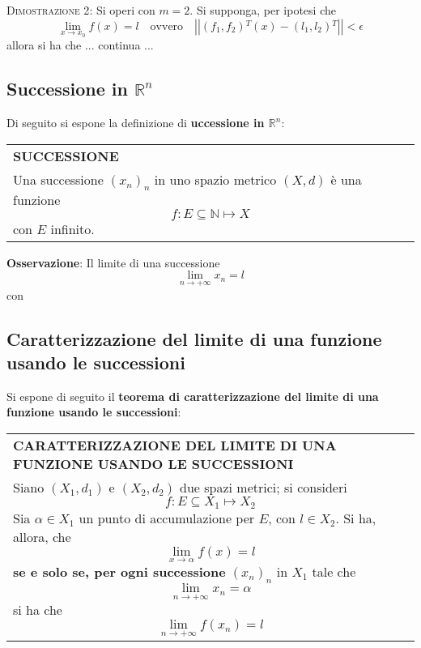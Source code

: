 \documentclass[a4paper]{extarticle}
\renewcommand\arraystretch{}
\begin{document}
\vspace{2em}
\noindent
\normalfont \normalsize
\textsc{Dimostrazione 2}: Si operi con $m=2$. Si supponga, per ipotesi che
\[\lim_{x \to x_0} f(x) = l \hspace{1em} \text{ovvero} \hspace{1em} \left \vert \left \vert (f_1,f_2){^T}(x) - (l_1,l_2){^T} \right \vert \right \vert < \epsilon\]
allora si ha che
... continua ...

\vspace{1em}
\noindent
\subsection{Successione in $\mathbb{R}^n$}
Di seguito si espone la definizione di \textbf{uccessione in $\mathbb{R}^n$}:

\vspace{1em}
\setlength{\tabcolsep}{14pt}
\renewcommand{\arraystretch}{2}
\noindent
\begin{tabularx}{\textwidth}{@{}|P|@{}}
    \hline
    {\textbf{SUCCESSIONE}}\\
    \parbox{\linewidth}{Una successione $(x_n)_n$ in uno spazio metrico $(X,d)$ è una funzione
    \[f : E \subseteq \mathbb{N} \longmapsto X\]
    con $E$ infinito.
    \vspace{3mm}}\\
    \hline
\end{tabularx}

\vspace{2em}
\noindent
\textbf{Osservazione}: Il limite di una successione
\[\lim_{n \to +\infty} x_n = l\]
con 

\vspace{2em}
\noindent
\subsection{Caratterizzazione del limite di una funzione usando le successioni}
Si espone di seguito il \textbf{teorema di caratterizzazione del limite di una funzione usando le successioni}:

\vspace{1em}
\setlength{\tabcolsep}{14pt}
\renewcommand{\arraystretch}{2}
\noindent
\begin{tabularx}{\textwidth}{@{}|P|@{}}
    \hline
    {\textbf{CARATTERIZZAZIONE DEL LIMITE DI UNA FUNZIONE USANDO LE SUCCESSIONI}}\\
    \parbox{\linewidth}{Siano $(X_1,d_1)$ e $(X_2,d_2)$ due spazi metrici; si consideri
    \[f : E \subseteq X_1 \longmapsto X_2\]
    Sia $\alpha \in X_1$ un punto di accumulazione per $E$, con $l \in X_2$. Si ha, allora, che
    \[\lim_{x \to \alpha} f(x) = l\]
    \textbf{se e solo se, per ogni successione} $(x_n)_n$ in $X_1$ tale che
    \[\lim_{n \to +\infty} x_n = \alpha\]
    si ha che
    \[\lim_{n \to +\infty} f(x_n) = l\]
    \vspace{-1mm}}\\
    \hline
\end{tabularx}
\end{document}
